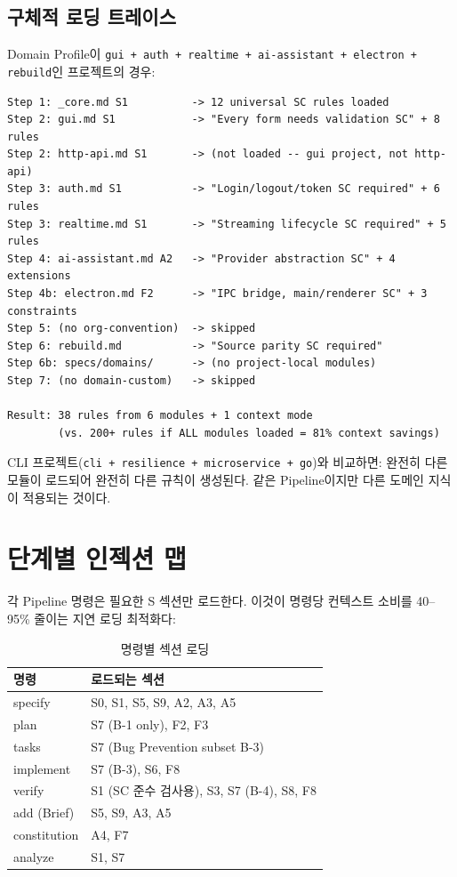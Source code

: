\documentclass[11pt,a4paper,openright,twoside]{report}
\begin{document}
\subsection{구체적 로딩 트레이스}

Domain Profile이 \texttt{gui + auth + realtime + ai-assistant + electron + rebuild}인 프로젝트의 경우:

\begin{lstlisting}[title={Module Loading Trace (specify step)}]
Step 1: _core.md S1          -> 12 universal SC rules loaded
Step 2: gui.md S1            -> "Every form needs validation SC" + 8 rules
Step 2: http-api.md S1       -> (not loaded -- gui project, not http-api)
Step 3: auth.md S1           -> "Login/logout/token SC required" + 6 rules
Step 3: realtime.md S1       -> "Streaming lifecycle SC required" + 5 rules
Step 4: ai-assistant.md A2   -> "Provider abstraction SC" + 4 extensions
Step 4b: electron.md F2      -> "IPC bridge, main/renderer SC" + 3 constraints
Step 5: (no org-convention)  -> skipped
Step 6: rebuild.md           -> "Source parity SC required"
Step 6b: specs/domains/      -> (no project-local modules)
Step 7: (no domain-custom)   -> skipped

Result: 38 rules from 6 modules + 1 context mode
        (vs. 200+ rules if ALL modules loaded = 81% context savings)
\end{lstlisting}

CLI 프로젝트(\texttt{cli + resilience + microservice + go})와 비교하면: 완전히 다른 모듈이 로드되어 완전히 다른 규칙이 생성된다. 같은 Pipeline이지만 다른 도메인 지식이 적용되는 것이다.

\section{단계별 인젝션 맵}
\label{sec:lazy-loading}

각 Pipeline 명령은 필요한 S 섹션만 로드한다. 이것이 명령당 컨텍스트 소비를 40--95\% 줄이는 지연 로딩 최적화다:

\begin{table}[H]
\centering
\caption{명령별 섹션 로딩}
\label{tab:section-loading}
\begin{tabularx}{\textwidth}{lX}
\toprule
\textbf{명령} & \textbf{로드되는 섹션} \\
\midrule
specify & S0, S1, S5, S9, A2, A3, A5 \\
plan & S7 (B-1 only), F2, F3 \\
tasks & S7 (Bug Prevention subset B-3) \\
implement & S7 (B-3), S6, F8 \\
verify & S1 (SC 준수 검사용), S3, S7 (B-4), S8, F8 \\
add (Brief) & S5, S9, A3, A5 \\
constitution & A4, F7 \\
analyze & S1, S7 \\
\bottomrule
\end{tabularx}
\end{table}
\end{document}
